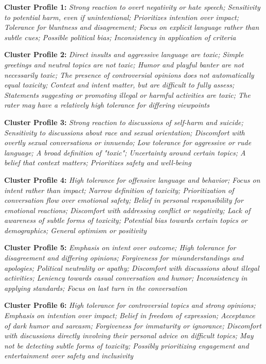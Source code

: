 \documentclass[11pt]{article}
\newcommand{\profiletext}[1]{\textit{#1}}
\begin{document}
\textbf{Cluster Profile 1:} \profiletext{Strong reaction to overt negativity or hate speech; Sensitivity to potential harm, even if unintentional; Prioritizes intention over impact; Tolerance for bluntness and disagreement; Focus on explicit language rather than subtle cues; Possible political bias; Inconsistency in application of criteria}

\textbf{Cluster Profile 2:} \profiletext{Direct insults and aggressive language are toxic; Simple greetings and neutral topics are not toxic; Humor and playful banter are not necessarily toxic; The presence of controversial opinions does not automatically equal toxicity; Context and intent matter, but are difficult to fully assess; Statements suggesting or promoting illegal or harmful activities are toxic; The rater may have a relatively high tolerance for differing viewpoints}

\textbf{Cluster Profile 3:} \profiletext{Strong reaction to discussions of self-harm and suicide; Sensitivity to discussions about race and sexual orientation; Discomfort with overtly sexual conversations or innuendo; Low tolerance for aggressive or rude language; A broad definition of "toxic"; Uncertainty around certain topics; A belief that context matters; Prioritizes safety and well-being}

\textbf{Cluster Profile 4:} \profiletext{High tolerance for offensive language and behavior; Focus on intent rather than impact; Narrow definition of toxicity; Prioritization of conversation flow over emotional safety; Belief in personal responsibility for emotional reactions; Discomfort with addressing conflict or negativity; Lack of awareness of subtle forms of toxicity; Potential bias towards certain topics or demographics; General optimism or positivity}

\textbf{Cluster Profile 5:} \profiletext{Emphasis on intent over outcome; High tolerance for disagreement and differing opinions; Forgiveness for misunderstandings and apologies; Political neutrality or apathy; Discomfort with discussions about illegal activities; Leniency towards casual conversation and humor; Inconsistency in applying standards; Focus on last turn in the conversation}

\textbf{Cluster Profile 6:} \profiletext{High tolerance for controversial topics and strong opinions; Emphasis on intention over impact; Belief in freedom of expression; Acceptance of dark humor and sarcasm; Forgiveness for immaturity or ignorance; Discomfort with discussions directly involving their personal advice on difficult topics; May not be detecting subtle forms of toxicity; Possibly prioritizing engagement and entertainment over safety and inclusivity}
\end{document}
